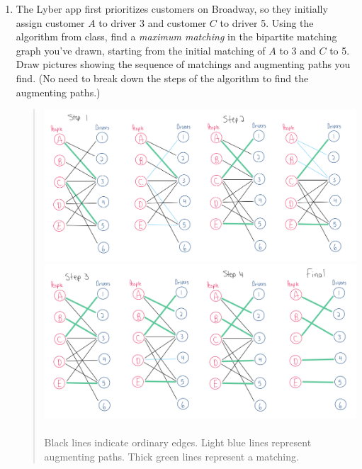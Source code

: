 \documentclass[11pt]{article}
\begin{document}
\begin{enumerate}
\begin{enumerate}
    
    \item The Lyber app first prioritizes customers on Broadway, so they initially assign customer $A$ to driver 3 and customer $C$ to driver 5. Using the algorithm from class, find a \textit{maximum matching} in the bipartite matching graph you've drawn, starting from the initial matching of $A$ to 3 and $C$ to 5. Draw pictures showing the sequence of matchings and augmenting paths you find. (No need to break down the steps of the algorithm to find the augmenting paths.)
     \begin{quote}
        \color{purple}
        \hspace*{-1.5in}
        \includegraphics[scale=0.4]{photos/q1b 1.png}
        \hspace*{-1.5in}
        \includegraphics[scale=0.4]{photos/q1b 2.png}
        \\ \\ 

        Black lines indicate ordinary edges. Light blue lines represent augmenting paths. Thick green lines represent a matching.
     \end{quote}


\end{enumerate}
\end{enumerate}
\end{document}
